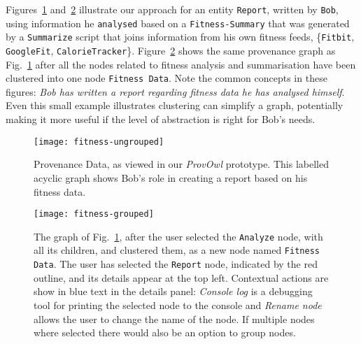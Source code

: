 Figures~\ref{fig:fitness-ungrouped} and~\ref{fig:fitness-grouped} illustrate our approach
for an entity \texttt{Report}, written by \texttt{Bob}, using information he \texttt{analysed}  based on a \texttt{Fitness-Summary} that was generated by a \texttt{Summarize} script that joins information 
from his own fitness feeds, \{\texttt{Fitbit}, \texttt{GoogleFit}, \texttt{CalorieTracker}\}.
Figure~\ref{fig:fitness-grouped} shows the same provenance graph as Fig.~\ref{fig:fitness-ungrouped} 
after all the nodes related to fitness analysis and summarisation have been clustered into one node \texttt{Fitness Data}. Note the common concepts in these figures: \textit{Bob has written a report regarding fitness data he has analysed himself}. Even this small example illustrates clustering can simplify a graph,
potentially making it more useful if the level of abstraction is right for Bob's needs.

\begin{figure}[h]
	\centering
	\texttt{[image: fitness-ungrouped]}
	\caption{Provenance Data, as viewed in our \textit{ProvOwl} prototype. This labelled acyclic graph shows Bob's role in creating a report based on his fitness data. }
	\label{fig:fitness-ungrouped}
\end{figure}

\begin{figure}[h]
	\centering
	\texttt{[image: fitness-grouped]}
	\caption{The graph of Fig.~\ref{fig:fitness-ungrouped}, after the user selected the \texttt{Analyze} node, with all its children, and clustered them, as a new node named \texttt{Fitness Data}. The user has selected the \texttt{Report} node, indicated by the red outline, and its details appear at the top left. Contextual actions are show in blue text in the details panel: \emph{Console log} is a debugging tool for printing the selected node to the console and \emph{Rename node} allows the user to change the name of the node. If multiple nodes where selected there would also be an option to group nodes.}
	\label{fig:fitness-grouped}
\end{figure}
